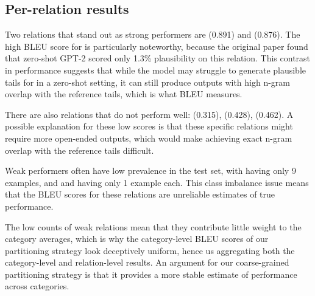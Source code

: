 


\subsection{Per-relation results}

Two relations that stand out as strong performers are  (0.891) and  (0.876). The high BLEU score for  is particularly noteworthy, because the original paper found that zero-shot GPT-2 scored only 1.3\% plausibility on this relation. This contrast in performance suggests that while the model may struggle to generate plausible tails for  in a zero-shot setting, it can still produce outputs with high n-gram overlap with the reference tails, which is what BLEU measures.



There are also relations that do not perform well:  (0.315),  (0.428),  (0.462). A possible explanation for these low scores is that these specific relations might require more open-ended outputs, which would make achieving exact n-gram overlap with the reference tails difficult.




Weak performers often have low prevalence in the test set, with  having only 9 examples, and  and  having only 1 example each. This class imbalance issue means that the BLEU scores for these relations are unreliable estimates of true performance.



The low counts of weak relations mean that they contribute little weight to the category averages, which is why the category-level BLEU scores of our partitioning strategy look deceptively uniform, hence us aggregating both the category-level and relation-level results. An argument for our coarse-grained partitioning strategy is that it provides a more stable estimate of performance across categories.